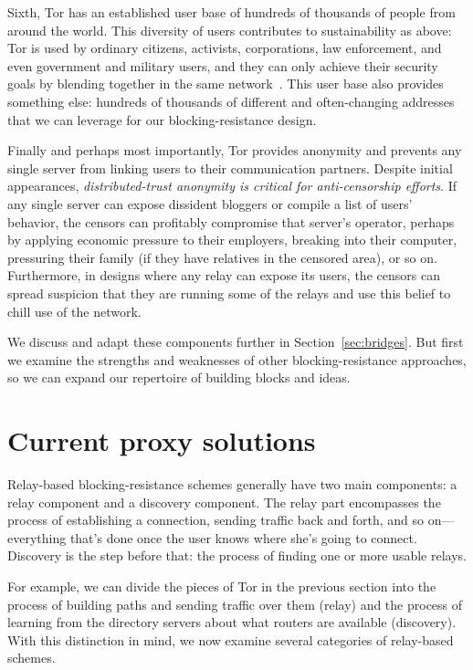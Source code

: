 \documentclass{llncs}
\begin{document}
Sixth, Tor has an established user base of hundreds of
thousands of people from around the world. This diversity of
users contributes to sustainability as above: Tor is used by
ordinary citizens, activists, corporations, law enforcement, and
even government and military users,
and they can
only achieve their security goals by blending together in the same
network~\cite{econymics,usability:weis2006}. This user base also provides
something else: hundreds of thousands of different and often-changing
addresses that we can leverage for our blocking-resistance design.

Finally and perhaps most importantly, Tor provides anonymity and prevents any
single server from linking users to their communication partners.  Despite
initial appearances, {\it distributed-trust anonymity is critical for
anti-censorship efforts}.  If any single server can expose dissident bloggers
or compile a list of users' behavior, the censors can profitably compromise
that server's operator, perhaps by  applying economic pressure to their
employers,
breaking into their computer, pressuring their family (if they have relatives
in the censored area), or so on.  Furthermore, in designs where any relay can
expose its users, the censors can spread suspicion that they are running some
of the relays and use this belief to chill use of the network.

We discuss and adapt these components further in
Section~\ref{sec:bridges}. But first we examine the strengths and
weaknesses of other blocking-resistance approaches, so we can expand
our repertoire of building blocks and ideas.

\section{Current proxy solutions}
\label{sec:related}

Relay-based blocking-resistance schemes generally have two main
components: a relay component and a discovery component. The relay part
encompasses the process of establishing a connection, sending traffic
back and forth, and so on---everything that's done once the user knows
where she's going to connect. Discovery is the step before that: the
process of finding one or more usable relays.

For example, we can divide the pieces of Tor in the previous section
into the process of building paths and sending
traffic over them (relay) and the process of learning from the directory
servers about what routers are available (discovery).  With this distinction
in mind, we now examine several categories of relay-based schemes.
\end{document}
